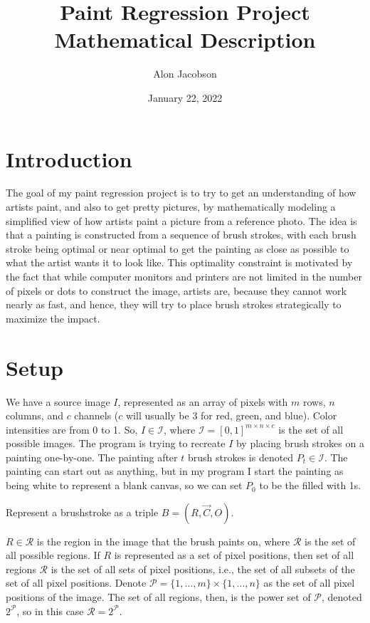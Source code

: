 \documentclass[12pt]{article}
\title{Paint Regression Project Mathematical Description}
\author{Alon Jacobson}
\date{January 22, 2022}
\begin{document}
\maketitle

\section{Introduction}
The goal of my paint regression project is to try to get an understanding of how artists paint, and also to get pretty pictures, by mathematically modeling a simplified view of how artists paint a picture from a reference photo. The idea is that a painting is constructed from a sequence of brush strokes, with each brush stroke being optimal or near optimal to get the painting as close as possible to what the artist wants it to look like. This optimality constraint is motivated by the fact that while computer monitors and printers are not limited in the number of pixels or dots to construct the image, artists are, because they cannot work nearly as fast, and hence, they will try to place brush strokes strategically to maximize the impact.

\section{Setup}
We have a source image $I$, represented as an array of pixels with $m$ rows, $n$ columns, and $c$ channels ($c$ will usually be 3 for red, green, and blue). Color intensities are from 0 to 1. So, $I \in \mathcal{I}$, where $\mathcal{I} = [0,1]^{m \times n \times c}$ is the set of all possible images. The program is trying to recreate $I$ by placing brush strokes on a painting  one-by-one. The painting after $t$ brush strokes is denoted $P_t \in \mathcal I$. The painting can start out as anything, but in my program I start the painting as being white to represent a blank canvas, so we can set $P_0$ to be the filled with 1s.

Represent a brushstroke as a triple $B = (R, \vec C, O)$. 

$R \in \mathcal{R}$ is the region in the image that the brush paints on, where $\mathcal{R}$ is the set of all possible regions. If $R$ is represented as a set of pixel positions, then set of all regions $\mathcal{R}$ is the set of all sets of pixel positions, i.e., the set of all subsets of the set of all pixel positions. Denote $\mathcal{P} = \{1,\dots,m\} \times \{1,\dots,n\}$ as the set of all pixel positions of the image. The set of all regions, then, is the power set of $\mathcal{P}$, denoted $2^\mathcal{P}$, so in this case $\mathcal{R} = 2^\mathcal{P}$.
\end{document}
